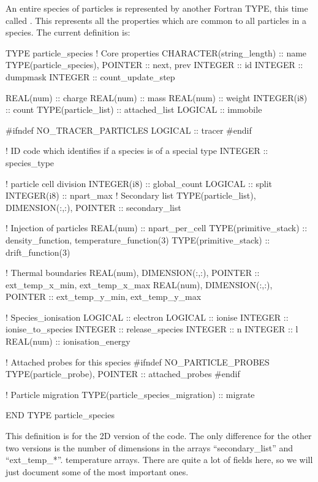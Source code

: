 An entire species of particles is represented by another Fortran TYPE, this
time called . This represents all the
properties which are common to all particles in a species.
The current definition is:
\begin{boxverbatim}
  TYPE particle_species
    ! Core properties
    CHARACTER(string_length) :: name
    TYPE(particle_species), POINTER :: next, prev
    INTEGER :: id
    INTEGER :: dumpmask
    INTEGER :: count_update_step

    REAL(num) :: charge
    REAL(num) :: mass
    REAL(num) :: weight
    INTEGER(i8) :: count
    TYPE(particle_list) :: attached_list
    LOGICAL :: immobile

#ifndef NO_TRACER_PARTICLES
    LOGICAL :: tracer
#endif

    ! ID code which identifies if a species is of a special type
    INTEGER :: species_type

    ! particle cell division
    INTEGER(i8) :: global_count
    LOGICAL :: split
    INTEGER(i8) :: npart_max
    ! Secondary list
    TYPE(particle_list), DIMENSION(:,:), POINTER :: secondary_list

    ! Injection of particles
    REAL(num) :: npart_per_cell
    TYPE(primitive_stack) :: density_function, temperature_function(3)
    TYPE(primitive_stack) :: drift_function(3)

    ! Thermal boundaries
    REAL(num), DIMENSION(:,:), POINTER :: ext_temp_x_min, ext_temp_x_max
    REAL(num), DIMENSION(:,:), POINTER :: ext_temp_y_min, ext_temp_y_max

    ! Species_ionisation
    LOGICAL :: electron
    LOGICAL :: ionise
    INTEGER :: ionise_to_species
    INTEGER :: release_species
    INTEGER :: n
    INTEGER :: l
    REAL(num) :: ionisation_energy

    ! Attached probes for this species
#ifndef NO_PARTICLE_PROBES
    TYPE(particle_probe), POINTER :: attached_probes
#endif

    ! Particle migration
    TYPE(particle_species_migration) :: migrate

  END TYPE particle_species
\end{boxverbatim}

This definition is for the 2D version of the code. The only difference for
the other two versions is the number of dimensions in the arrays
``secondary\_list'' and ``ext\_temp\_*''.
temperature arrays.
There are quite a lot of fields here, so we will just document some of the
most important ones.

